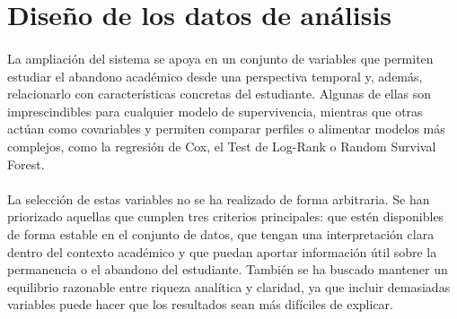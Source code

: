 \section{Diseño de los datos de análisis}

\paragraph*{}La ampliación del sistema se apoya en un conjunto de variables que permiten estudiar el abandono académico desde una perspectiva temporal y, además, relacionarlo con características concretas del estudiante. Algunas de ellas son imprescindibles para cualquier modelo de supervivencia, mientras que otras actúan como covariables y permiten comparar perfiles o alimentar modelos más complejos, como la regresión de Cox, el Test de Log-Rank o Random Survival Forest.

\paragraph*{}La selección de estas variables no se ha realizado de forma arbitraria. Se han priorizado aquellas que cumplen tres criterios principales: que estén disponibles de forma estable en el conjunto de datos, que tengan una interpretación clara dentro del contexto académico y que puedan aportar información útil sobre la permanencia o el abandono del estudiante. También se ha buscado mantener un equilibrio razonable entre riqueza analítica y claridad, ya que incluir demasiadas variables puede hacer que los resultados sean más difíciles de explicar.

